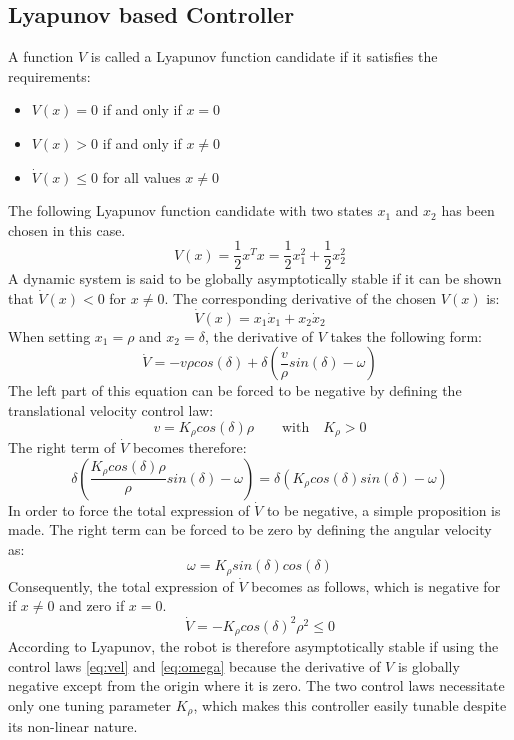 \documentclass[a4paper, 11pt]{article}
\begin{document}
\subsection{Lyapunov based Controller}
A function $V$ is called a Lyapunov function candidate if it satisfies the requirements: 
\begin{itemize}
	\item $V(x) = 0$ if and only if $x = 0$
	\item $V(x) > 0$ if and only if $x \not=0$
	\item $\dot{V}(x) \le 0$ for all values $x \not = 0$ 
\end{itemize}
The following Lyapunov function candidate with two states $x_1$ and $x_2$ has been chosen in this case. 
\begin{equation}
V(x) = \frac{1}{2}x^Tx = \frac{1}{2}x_1^2 + \frac{1}{2}x_2^2
\end{equation}
A dynamic system is said to be globally asymptotically stable if it can be shown that $\dot{V}(x) < 0$ for $x \not = 0$. The corresponding derivative of the chosen $V(x)$ is:
\begin{equation}
\dot{V}(x) = x_1\dot{x}_1 + x_2\dot{x}_2
\end{equation}
When setting $x_1 = \rho$ and $x_2 = \delta$, the derivative of $V$ takes the following form:
\begin{equation}
\dot{V} = -v \rho cos(\delta) + \delta (\frac{v}{\rho} sin(\delta) - \omega)
\end{equation}
The left part of this equation can be forced to be negative by defining the translational velocity control law:
\begin{equation}
	v = K_{\rho} cos(\delta) \rho \qquad \textrm{with} \quad K_{\rho} > 0
	\label{eq:vel}
\end{equation}
The right term of $\dot{V}$ becomes therefore:
\begin{equation}
	\delta (\frac{K_{\rho} cos(\delta) \rho}{\rho} sin(\delta) - \omega) = \delta\left( K_{\rho}cos(\delta) sin(\delta) - \omega \right)
\end{equation}
In order to force the total expression of $\dot{V}$ to be negative, a simple proposition is made. The right term can be forced to be zero by defining the angular velocity as:
\begin{equation}
	\omega = K_{\rho} sin(\delta) cos(\delta)
	\label{eq:omega}
\end{equation}
Consequently, the total expression of $\dot{V}$ becomes as follows, which is negative for if $x \not = 0$ and zero if $x = 0$.
\begin{equation}
\dot{V} = -K_{\rho} cos(\delta)^2 \rho^2 \le 0 
\end{equation}
According to Lyapunov, the robot is therefore asymptotically stable if using the control laws \eqref{eq:vel} and \eqref{eq:omega} because the derivative of $V$ is globally negative except from the origin where it is zero. The two control laws necessitate only one tuning parameter $K_{\rho}$, which makes this controller easily tunable despite its non-linear nature. 
\end{document}
